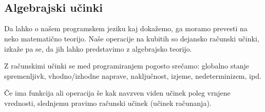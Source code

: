 \begin{prooftree}[center=false]
\end{prooftree}\\
\begin{prooftree}[center=false]
\end{prooftree}\quad
\begin{prooftree}[center=false]
\end{prooftree}\\
\begin{prooftree}[center=false]
\end{prooftree}\quad
\begin{prooftree}[center=false]
\end{prooftree}

\subsection{Algebrajski učinki}
Da lahko o našem programskem jeziku kaj dokažemo, ga moramo prevesti na neko matematično teorijo.
Naše operacije na kubitih so dejansko računski učinki,
izkaže pa se, da jih lahko predstavimo z algebrajsko teorijo.

Z računskimi učinki se med programiranjem pogosto srečamo: globalno stanje spremenljivk, vhodno/izhodne naprave, naključnost, izjeme, nedeterminizem, ipd.

\begin{definition}
    Če ima funkcija ali operacija še kak navzven viden učinek poleg vrnjene vrednosti, slednjemu pravimo računski učinek (učinek računanja).
\end{definition}

